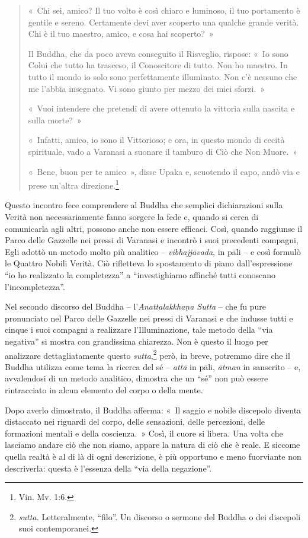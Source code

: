 \begin{quote}
«~Chi sei, amico? Il tuo volto è così chiaro e luminoso, il tuo
portamento è gentile e sereno. Certamente devi aver scoperto una qualche
grande verità. Chi è il tuo maestro, amico, e cosa hai scoperto?~»

Il Buddha, che da poco aveva conseguito il Risveglio, rispose: «~Io sono
Colui che tutto ha trasceso, il Conoscitore di tutto. Non ho maestro. In
tutto il mondo io solo sono perfettamente illuminato. Non c'è nessuno
che me l'abbia insegnato. Vi sono giunto per mezzo dei miei sforzi.~»

«~Vuoi intendere che pretendi di avere ottenuto la vittoria sulla
nascita e sulla morte?~»

«~Infatti, amico, io sono il Vittorioso; e ora, in questo mondo di
cecità spirituale, vado a Varanasi a suonare il tamburo di Ciò che Non
Muore.~»

«~Bene, buon per te amico~», disse Upaka e, scuotendo il capo, andò via e
prese un'altra direzione.\footnote{Vin. Mv. 1:6.}
\end{quote}

Questo incontro fece comprendere al Buddha che semplici dichiarazioni
sulla Verità non necessariamente fanno sorgere la fede e, quando si
cerca di comunicarla agli altri, possono anche non essere efficaci.
Così, quando raggiunse il Parco delle Gazzelle nei pressi di Varanasi e
incontrò i suoi precedenti compagni, Egli adottò un metodo molto più
analitico -- \emph{vibhajjāvada}, in pāli -- e così formulò le Quattro
Nobili Verità. Ciò rifletteva lo spostamento di piano dall'espressione
``io ho realizzato la completezza'' a ``investighiamo affinché tutti
conoscano l'incompletezza''.

Nel secondo discorso del Buddha -- l'\emph{Anattalakkhaṇa Sutta} -- che
fu pure pronunciato nel Parco delle Gazzelle nei pressi di Varanasi e
che indusse tutti e cinque i suoi compagni a realizzare l'Illuminazione,
tale metodo della ``via negativa'' si mostra con grandissima chiarezza.
Non è questo il luogo per analizzare dettagliatamente questo
\emph{sutta},\footnote{\emph{sutta.} Letteralmente, ``filo''. Un
  discorso o sermone del Buddha o dei discepoli suoi contemporanei.}
però, in breve, potremmo dire che il Buddha utilizza come tema la
ricerca del sé -- \emph{attā} in pāli, \emph{ātman} in sanscrito -- e,
avvalendosi di un metodo analitico, dimostra che un ``sé'' non può
essere rintracciato in alcun elemento del corpo o della mente.

Dopo averlo dimostrato, il Buddha afferma: «~Il saggio e nobile
discepolo diventa distaccato nei riguardi del corpo, delle sensazioni,
delle percezioni, delle formazioni mentali e della coscienza.~» Così, il
cuore si libera. Una volta che lasciamo andare ciò che non siamo, appare
la natura di ciò che è reale. E siccome quella realtà è al di là di ogni
descrizione, è più opportuno e meno fuorviante non descriverla: questa è
l'essenza della ``via della negazione''.

